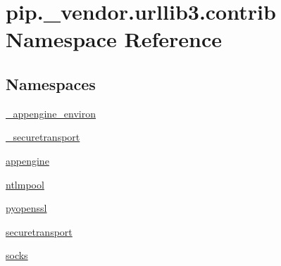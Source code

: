 \hypertarget{namespacepip_1_1__vendor_1_1urllib3_1_1contrib}{}\section{pip.\+\_\+vendor.\+urllib3.\+contrib Namespace Reference}
\label{namespacepip_1_1__vendor_1_1urllib3_1_1contrib}
\subsection*{Namespaces}
\begin{DoxyCompactItemize}
\item 
 \hyperlink{namespacepip_1_1__vendor_1_1urllib3_1_1contrib_1_1__appengine__environ}{\+\_\+appengine\+\_\+environ}
\item 
 \hyperlink{namespacepip_1_1__vendor_1_1urllib3_1_1contrib_1_1__securetransport}{\+\_\+securetransport}
\item 
 \hyperlink{namespacepip_1_1__vendor_1_1urllib3_1_1contrib_1_1appengine}{appengine}
\item 
 \hyperlink{namespacepip_1_1__vendor_1_1urllib3_1_1contrib_1_1ntlmpool}{ntlmpool}
\item 
 \hyperlink{namespacepip_1_1__vendor_1_1urllib3_1_1contrib_1_1pyopenssl}{pyopenssl}
\item 
 \hyperlink{namespacepip_1_1__vendor_1_1urllib3_1_1contrib_1_1securetransport}{securetransport}
\item 
 \hyperlink{namespacepip_1_1__vendor_1_1urllib3_1_1contrib_1_1socks}{socks}
\end{DoxyCompactItemize}
